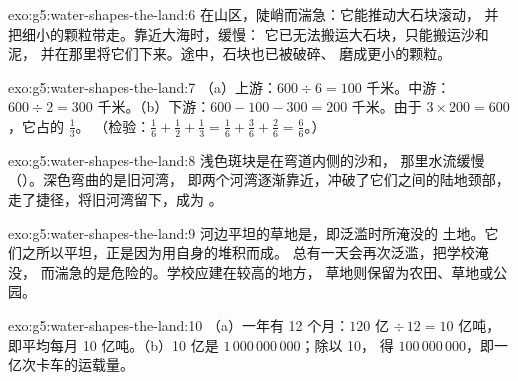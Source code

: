 \begin{solution}{exo:g5:water-shapes-the-land:6}
在山区，陡峭而湍急：它能推动大石块滚动，
并把细小的颗粒带走。靠近大海时，缓慢：
它已无法搬运大石块，只能搬运沙和泥，
并在那里将它们下来。途中，石块也已被破碎、
磨成更小的颗粒。
\end{solution}

\begin{solution}{exo:g5:water-shapes-the-land:7}
（a）上游：$600 \div 6 = 100$ 千米。中游：
$600 \div 2 = 300$ 千米。（b）下游：$600 - 100 - 300 = 200$
千米。由于 $3 \times 200 = 600$，它占的 $\frac{1}{3}$。
（检验：$\frac{1}{6} + \frac{1}{2} + \frac{1}{3} = \frac{1}{6} +
\frac{3}{6} + \frac{2}{6} = \frac{6}{6}$。）
\end{solution}

\begin{solution}{exo:g5:water-shapes-the-land:8}
浅色斑块是在弯道内侧的沙和，
那里水流缓慢（）。深色弯曲的是旧河湾，
即两个河湾逐渐靠近，冲破了它们之间的陆地颈部，
走了捷径，将旧河湾留下，成为
。
\end{solution}

\begin{solution}{exo:g5:water-shapes-the-land:9}
河边平坦的草地是，即泛滥时所淹没的
土地。它们之所以平坦，正是因为用自身的堆积而成。
总有一天会再次泛滥，把学校淹没，
而湍急的是危险的。学校应建在较高的地方，
草地则保留为农田、草地或公园。
\end{solution}

\begin{solution}{exo:g5:water-shapes-the-land:10}
（a）一年有 12 个月：$120$ 亿 $\div\, 12 = 10$ 亿吨，
即平均每月 10 亿吨。（b）10 亿是 $1\,000\,000\,000$；除以 10，
得 $100\,000\,000$，即一亿次卡车的运载量。
\end{solution}

